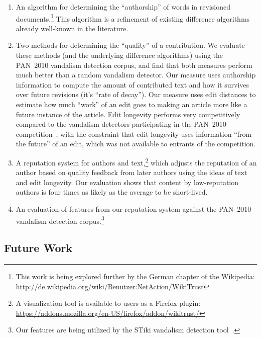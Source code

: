 \begin{enumerate}

\item An algorithm for determining the ``authorship'' of words in
  revisioned documents.\footnote{This work is being explored further
  by the German chapter of the Wikipedia: \\
  \url{http://de.wikipedia.org/wiki/Benutzer:NetAction/WikiTrust}}
  This algorithm is a refinement of existing difference algorithms
  already well-known in the literature.

\item Two methods for determining the ``quality'' of a contribution.
  We evaluate these methods (and the underlying difference algorithms)
  using the PAN~2010 vandalism detection corpus, and find that both
  measures perform much better than a random vandalism detector.
  Our  measure uses authorship information to
  compute the amount of contributed text and how it survives over
  future revisions (it's ``rate of decay'').
  Our  measure uses edit distances to estimate
  how much ``work'' of an edit goes to making an article more like a
  future instance of the article.
  Edit longevity performs very competitively
  compared to the vandalism detectors participating in the
  PAN~2010 competition~\cite{Potthast2010b}, with the constraint that
  edit longevity uses information ``from the future'' of an edit,
  which was not available to entrants of the competition.

\item A reputation system for authors and text,\footnote{A visualization
  tool is available to users as a Firefox plugin: \\
  \url{https://addons.mozilla.org/en-US/firefox/addon/wikitrust/}}
  which adjusts the reputation of an author based on quality feedback
  from later authors using the ideas of text and edit longevity.
  Our evaluation shows that content by low-reputation authors is
  four times as likely as the average to be short-lived.

\item An evaluation of features from our reputation system
  against the PAN~2010 vandalism detection
  corpus.\footnote{Our features are being utilized by the
  STiki vandalism detection tool~\cite{wiki:STiki}.}

\end{enumerate}

\subsection{Future Work}

